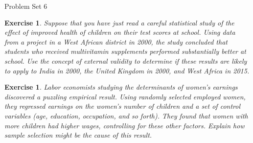 \documentclass{article}
\newtheorem{exercise}[theorem]{Exercise}
\begin{document}
\begin{center} 
{\Large Problem Set 6}
\end{center}


\begin{exercise}%
Suppose that you have just read a careful statistical study of the effect of improved health of children on their test scores at school. Using data from a project in a West African district in 2000, the study concluded that students who received multivitamin supplements performed substantially better at school. Use the concept of external validity to determine if these results are likely to apply to India in 2000, the United Kingdom in 2000, and West Africa in 2015.
\end{exercise}
\vspace{.5cm}

\begin{exercise} %
Labor economists studying the determinants of women’s earnings discovered a puzzling empirical result. Using randomly selected employed women, they regressed earnings on the women’s number of children and a set of control variables (age, education, occupation, and so forth). They found that women with more children had higher wages, controlling for these other factors. Explain how sample selection might be the cause of this result.
\end{exercise}
\vspace{.5cm}
\end{document}
